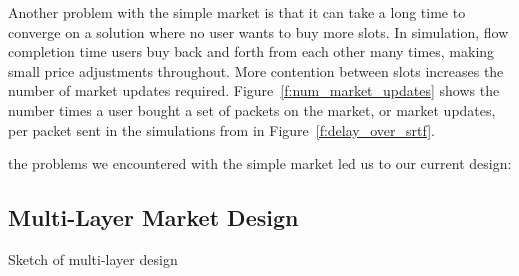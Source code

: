 Another problem with the simple market is that it can take a long time to converge on a solution where no user wants to buy more slots. In simulation, flow completion time users buy back and forth from each other many times, making small price adjustments throughout. More contention between slots increases the number of market updates required. 
Figure~\ref{f:num_market_updates} shows the number times a user bought a set of packets on the market, or market updates, per packet sent in the simulations from in Figure~\ref{f:delay_over_srtf}.


the problems we encountered with the simple market led us to our current design:
\subsection{Multi-Layer Market Design}

Sketch of multi-layer design
